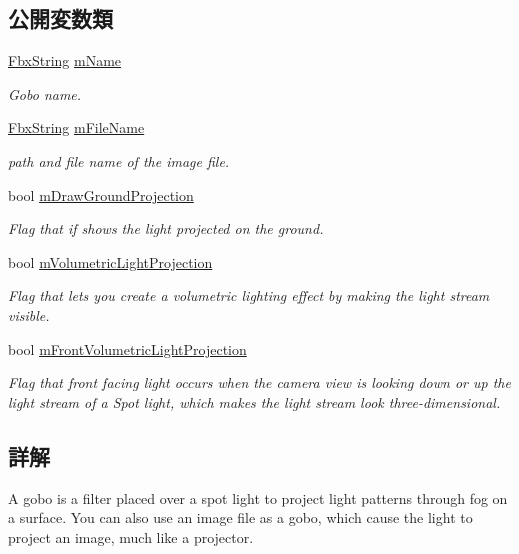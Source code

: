 \subsection*{公開変数類}
\begin{DoxyCompactItemize}
\item 
\hyperlink{class_fbx_string}{Fbx\+String} \hyperlink{class_fbx_gobo_a4c72db9f7ab3356ed6efe27f271f20b1}{m\+Name}
\begin{DoxyCompactList}\small\item\em Gobo name. \end{DoxyCompactList}\item 
\hyperlink{class_fbx_string}{Fbx\+String} \hyperlink{class_fbx_gobo_a5b092ea9f3fd2f5c589135e8fe4f5ef6}{m\+File\+Name}
\begin{DoxyCompactList}\small\item\em path and file name of the image file. \end{DoxyCompactList}\item 
bool \hyperlink{class_fbx_gobo_a1c8766e60f641764794d1d444bbf3a7b}{m\+Draw\+Ground\+Projection}
\begin{DoxyCompactList}\small\item\em Flag that if shows the light projected on the ground. \end{DoxyCompactList}\item 
bool \hyperlink{class_fbx_gobo_a2dfb9b008dfb672a5de78e6dfffe0d89}{m\+Volumetric\+Light\+Projection}
\begin{DoxyCompactList}\small\item\em Flag that lets you create a volumetric lighting effect by making the light stream visible. \end{DoxyCompactList}\item 
bool \hyperlink{class_fbx_gobo_a7d0ff5a850609339492d0cd218df352b}{m\+Front\+Volumetric\+Light\+Projection}
\begin{DoxyCompactList}\small\item\em Flag that front facing light occurs when the camera view is looking down or up the light stream of a Spot light, which makes the light stream look three-\/dimensional. \end{DoxyCompactList}\end{DoxyCompactItemize}


\subsection{詳解}
A gobo is a filter placed over a spot light to project light patterns through fog on a surface. You can also use an image file as a gobo, which cause the light to project an image, much like a projector. 

